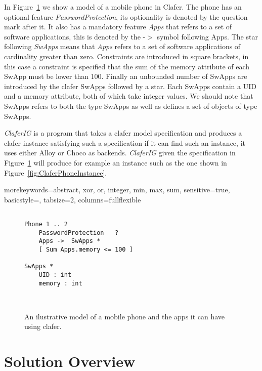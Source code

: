 \documentclass{article}
\newcommand{\figref}[1]{Figure~\ref{#1}}
\begin{document}
 In \figref{fig:ClaferPhone}  we show a model of a mobile phone in Clafer. The phone has an optional feature \emph{PasswordProtection}, its optionality is denoted by the question mark after it. It also has a mandatory feature \emph{Apps} that refers  to a set of software applications, this is denoted by the  -$>$ symbol following  Apps.  The star following  \emph{SwApps} means that \emph{Apps} refers to a set of software applications of cardinality greater than zero. Constraints are introduced in  square brackets, in this case a constraint is specified that the sum of the memory attribute of each SwApp must be lower than 100. Finally an unbounded number of SwApps are introduced by the clafer SwApps followed by a star. Each SwApps contain a UID and a memory attribute, both of which take integer values.  We should note that SwApps refers to both the type SwApps as well as defines a set of objects of type SwApps.

\emph{ClaferIG}  is a program that takes a clafer model specification and produces a clafer instance satisfying such a specification if it can find such an instance, it uses either Alloy or Choco as backends. \emph{ClaferIG} given the specification in  \figref{fig:ClaferPhone}  will produce for example an instance such as the one shown in \figref{fig:ClaferPhoneInstance}.


{morekeywords={abstract, xor, or, integer, min, max, sum},
sensitive=true,
basicstyle={\sffamily\small},
tabsize=2,
columns=fullflexible
}

\begin{figure}[!t]
 \begin{lstlisting}[language=clafer]

Phone 1 .. 2
	PasswordProtection 	 ?
	Apps ->  SwApps *
	[ Sum Apps.memory <= 100 ]

SwApps * 
	UID : int
	memory : int



  \end{lstlisting}
 \caption{An ilustrative model of a mobile phone and the apps it can have using clafer.}
 \label{fig:ClaferPhone}
\end{figure}

\section{Solution Overview}
\end{document}
